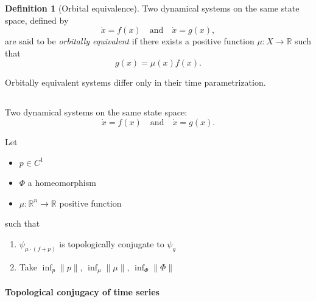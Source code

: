 \documentclass{article}
\theoremstyle{definition} \newtheorem{definition}{Definition}  \newtheorem{example}{Example}
\theoremstyle{remark} \newtheorem{remark}{Remark}
\newcommand{\reals}{\mathbb{R}}
\newcounter{ct}
\begin{document}
\begin{definition}[Orbital equivalence]
Two dynamical systems on the same state space, defined by 
\[
\dot{x} = f(x) \quad \text{and} \quad \dot{x} = g(x),
\]
are said to be \emph{orbitally equivalent} if there exists a positive function \( \mu \colon X \to \mathbb{R} \) such that
\[
g(x) = \mu(x) f(x).
\]
\end{definition}
Orbitally equivalent systems differ only in their time parametrization.


\subsection{}
Two dynamical systems on the same state space:
\[
\dot{x} = f(x) \quad \text{and} \quad \dot{x} = g(x).
\]

Let 
\begin{itemize}
\item $p\in C^1$
\item $\Phi$ a homeomorphism
\item $\mu\colon \reals^n\rightarrow \reals$ positive function
\end{itemize}
such that 
\begin{enumerate}
\item $\psi_{\mu \cdot (f+p)}$ is topologically conjugate to $\psi_{g}$
\item Take $\inf_p \|p\|$, $\inf_\mu \|\mu\|$, $\inf_\Phi \|\Phi\|$
\end{enumerate}


\paragraph{Topological conjugacy of time series}
\citep{dlotko2024topconj}
\end{document}
